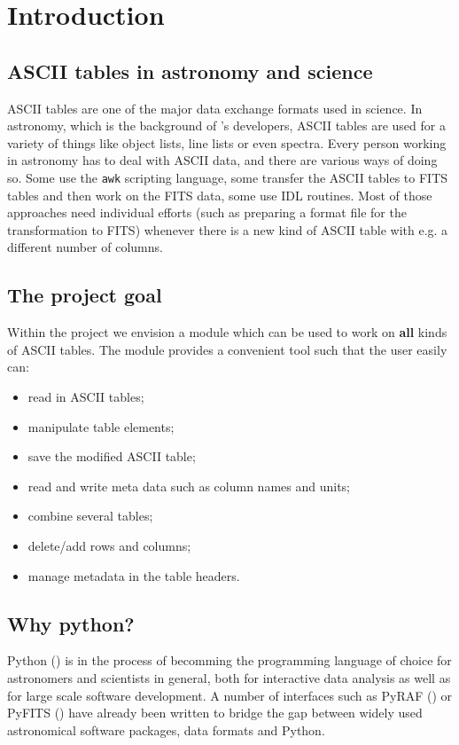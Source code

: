 \section{Introduction}
\label{introduction}

\subsection{ASCII tables in astronomy and science}
\label{atables_astronomy}
ASCII tables are one of the major data exchange formats used in science.
In astronomy, which is the background of \AAD's developers, ASCII tables are
used for a variety of things like object lists, line lists or
even spectra. Every person working in astronomy has to deal with
ASCII data, and there are various ways of doing so. Some use the {\tt awk}
scripting language, some transfer the ASCII tables to FITS tables and then
work on the FITS data, some use IDL routines. Most of those approaches need
individual efforts (such as preparing a format file for the
transformation to FITS) whenever there is a new kind of ASCII table
with e.g. a different number of columns.\\


\subsection{The project goal}
\label{project_goal}
Within the \AAD project we envision a module which can be
used to work on {\bf all} kinds of ASCII tables. The module provides a
convenient tool such that the user easily can:

\begin{itemize}
\item read in ASCII tables;
\item manipulate table elements;
\item save the modified ASCII table;
\item read and write meta data such as column names and units;
\item combine several tables;
\item delete/add rows and columns;
\item manage metadata in the table headers.
\end{itemize}

\subsection{Why python?}
\label{why_python}
Python () is
in the process of becomming the programming
language of choice for astronomers and scientists in general, both for
interactive data analysis as well as for large scale software development.
A number of interfaces such as PyRAF
()
or PyFITS \newline
()
have already been written to bridge the gap between widely used
astronomical software
packages, data formats and Python.

